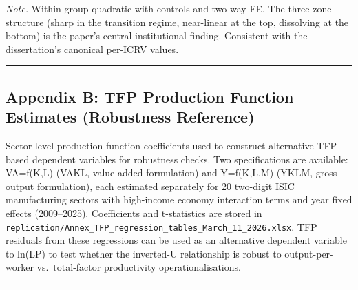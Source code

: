 \documentclass[
  12pt,a4paper]{article}
\begin{document}
\emph{Note.} Within-group quadratic with controls and two-way FE. The
three-zone structure (sharp in the transition regime, near-linear at the
top, dissolving at the bottom) is the paper's central institutional
finding. Consistent with the dissertation's canonical per-ICRV values.

\begin{center}\rule{0.5\linewidth}{0.5pt}\end{center}

\hypertarget{appendix-b-tfp-production-function-estimates-robustness-reference}{%
\subsection{Appendix B: TFP Production Function Estimates (Robustness
Reference)}\label{appendix-b-tfp-production-function-estimates-robustness-reference}}

Sector-level production function coefficients used to construct
alternative TFP-based dependent variables for robustness checks. Two
specifications are available: VA=f(K,L) (VAKL, value-added formulation)
and Y=f(K,L,M) (YKLM, gross-output formulation), each estimated
separately for 20 two-digit ISIC manufacturing sectors with high-income
economy interaction terms and year fixed effects (2009--2025).
Coefficients and t-statistics are stored in
\texttt{replication/Annex\_TFP\_regression\_tables\_March\_11\_2026.xlsx}.
TFP residuals from these regressions can be used as an alternative
dependent variable to ln(LP) to test whether the inverted-U relationship
is robust to output-per-worker vs.~total-factor productivity
operationalisations.

\begin{center}\rule{0.5\linewidth}{0.5pt}\end{center}
\end{document}
